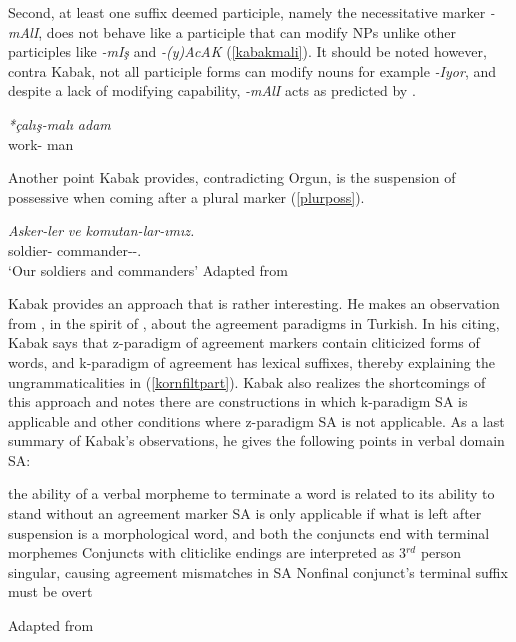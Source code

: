 Second, at least one suffix deemed participle, namely the necessitative marker \textit{-mAlI}, does not behave like a participle that can modify NPs unlike other participles like \textit{-mIş} and \textit{-(y)AcAK} (\ref{kabakmali}). It should be noted however, contra Kabak, not all participle forms can modify nouns for example \textit{-Iyor}, and despite a lack of modifying capability, \textit{-mAlI} acts as predicted by \cite{kornfilt1996some}.
\begin{exe}
    \ex \label{kabakmali}
    \gll 
    \textit{*çalış-malı} \textit{adam} \\ work-{\Nec} man \\
\end{exe}

Another point Kabak provides, contradicting Orgun, is the suspension of possessive when coming after a plural marker (\ref{plurposs}).

\begin{exe}
    \ex \label{plurposs}
    \gll
    \textit{Asker-ler} \textit{ve} \textit{komutan-lar-ımız.} \\ soldier-{\Pl} {\And} commander-{\Pl}-{\First}{\Pl}.{\Poss} \\
    \glt `Our soldiers and commanders'
    \hfill Adapted from \cite{kabak2007turkish}
\end{exe}

Kabak provides an approach that is rather interesting. He makes an observation from \cite{good2005morphosyntax}, in the spirit of \cite{erdal2000clitics}, about the agreement paradigms in Turkish. In his citing, Kabak says that z-paradigm of agreement markers contain cliticized forms of words, and k-paradigm of agreement has lexical suffixes, thereby explaining the ungrammaticalities in (\ref{kornfiltpart}). Kabak also realizes the shortcomings of this approach and notes there are constructions in which k-paradigm SA is applicable and other conditions where z-paradigm SA is not applicable. As a last summary of Kabak's observations, he gives the following points in verbal domain SA:
\begin{exe}
\sn \begin{xlisti}
    \ex the ability of a verbal morpheme to terminate a word is related to its ability to stand without an agreement marker
    \ex SA is only applicable if what is left after suspension is a morphological word, and both the conjuncts end with terminal morphemes
    \ex Conjuncts with cliticlike endings are interpreted as 3$^{rd}$ person singular, causing agreement mismatches in SA
    \ex Nonfinal conjunct's terminal suffix must be overt
    \end{xlisti}
    \hfill Adapted from \cite{kabak2007turkish}
\end{exe}

